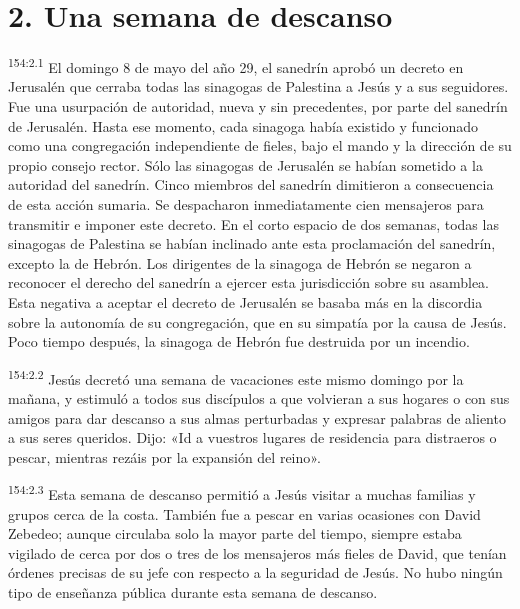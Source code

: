 \section*{2. Una semana de descanso}
\par 
\textsuperscript{154:2.1} El domingo 8 de mayo del año 29, el sanedrín aprobó un decreto en Jerusalén que cerraba todas las sinagogas de Palestina a Jesús y a sus seguidores. Fue una usurpación de autoridad, nueva y sin precedentes, por parte del sanedrín de Jerusalén. Hasta ese momento, cada sinagoga había existido y funcionado como una congregación independiente de fieles, bajo el mando y la dirección de su propio consejo rector. Sólo las sinagogas de Jerusalén se habían sometido a la autoridad del sanedrín. Cinco miembros del sanedrín dimitieron a consecuencia de esta acción sumaria. Se despacharon inmediatamente cien mensajeros para transmitir e imponer este decreto. En el corto espacio de dos semanas, todas las sinagogas de Palestina se habían inclinado ante esta proclamación del sanedrín, excepto la de Hebrón. Los dirigentes de la sinagoga de Hebrón se negaron a reconocer el derecho del sanedrín a ejercer esta jurisdicción sobre su asamblea. Esta negativa a aceptar el decreto de Jerusalén se basaba más en la discordia sobre la autonomía de su congregación, que en su simpatía por la causa de Jesús. Poco tiempo después, la sinagoga de Hebrón fue destruida por un incendio.

\par 
\textsuperscript{154:2.2} Jesús decretó una semana de vacaciones este mismo domingo por la mañana, y estimuló a todos sus discípulos a que volvieran a sus hogares o con sus amigos para dar descanso a sus almas perturbadas y expresar palabras de aliento a sus seres queridos. Dijo: «Id a vuestros lugares de residencia para distraeros o pescar, mientras rezáis por la expansión del reino».

\par 
\textsuperscript{154:2.3} Esta semana de descanso permitió a Jesús visitar a muchas familias y grupos cerca de la costa. También fue a pescar en varias ocasiones con David Zebedeo; aunque circulaba solo la mayor parte del tiempo, siempre estaba vigilado de cerca por dos o tres de los mensajeros más fieles de David, que tenían órdenes precisas de su jefe con respecto a la seguridad de Jesús. No hubo ningún tipo de enseñanza pública durante esta semana de descanso.

